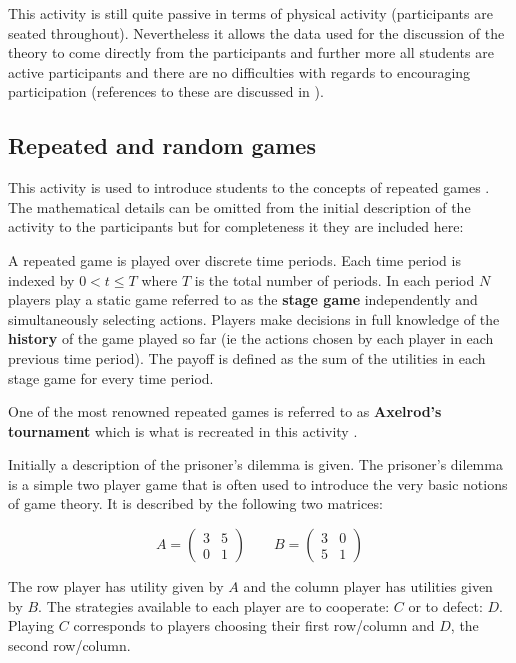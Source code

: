 \documentclass[12pt]{article}
\begin{document}
This activity is still quite passive in terms of physical activity (participants are
seated throughout). Nevertheless it allows the data used for the discussion of
the theory to come directly from the participants and further more all students
are active participants and there are no difficulties with regards to
encouraging participation (references to these are discussed in \cite{Rocca2010}).

\subsection{Repeated and random games}\label{sec:repeated_games}

This activity is used to introduce students to the concepts of repeated games
\cite{Maschler2013}. The mathematical details can be omitted from the initial
description of the activity to the participants but for completeness it they are
included here:

A repeated game is played over discrete time periods. Each time period is
indexed by \(0<t\leq T\) where \(T\) is the total number of periods.  In each
period \(N\) players play a static game referred to as the \textbf{stage game}
independently and simultaneously selecting actions.  Players make decisions in
full knowledge of the \textbf{history} of the game played so far (ie the actions
chosen by each player in each previous time period).  The payoff is defined
as the sum of the utilities in each stage game for every time period.

One of the most renowned repeated games is referred to as \textbf{Axelrod's
tournament} which is what is recreated in this activity \cite{Axelrod1980a,
Axelrod1980b}.

Initially a description of the prisoner's dilemma \cite{Maschler2013} is given.
The prisoner's dilemma is a simple two player game that is often used to
introduce the very basic notions of game theory. It is described by the
following two matrices:

\[
    A =
    \begin{pmatrix}
        3&5\\
        0&1
    \end{pmatrix}
    \qquad
    B =
    \begin{pmatrix}
        3&0\\
        5&1
    \end{pmatrix}
\]

The row player has utility given by \(A\) and the column player has utilities
given by \(B\).
The strategies available to each player are to cooperate: \(C\) or to defect:
\(D\). Playing \(C\) corresponds to players choosing their first row/column and
\(D\), the second row/column.
\end{document}
